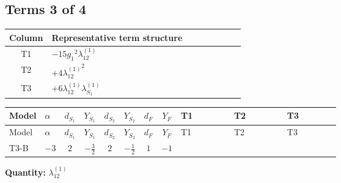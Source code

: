 \documentclass[8pt]{article}
\begin{document}
\begin{landscape}
\subsection*{Terms 3 of 4}
\begin{center}
\begin{tabular}{@{}c >{\raggedright\arraybackslash}p{0.82\linewidth}@{}}
\toprule
Column & Representative term structure \\
\midrule
T1 & \(\displaystyle -15 {g_1}^2 {\lambda_{12}^{(1)}}\) \\
\midrule
T2 & \(\displaystyle +4 {\lambda_{12}^{(1)}}^2\) \\
\midrule
T3 & \(\displaystyle +6 {\lambda_{12}^{(1)}} {\lambda_{S_1}^{(1)}}\) \\
\midrule
\bottomrule
\end{tabular}
\end{center}
\smallskip
\tiny
\begin{longtable}{@{}llcccccc >{\raggedright\arraybackslash}p{0.21\linewidth} >{\raggedright\arraybackslash}p{0.21\linewidth} >{\raggedright\arraybackslash}p{0.21\linewidth}@{}}
\toprule
Model & $\alpha$ & $d_{S_1}$ & $Y_{S_1}$ & $d_{S_2}$ & $Y_{S_2}$ & $d_F$ & $Y_F$ & T1 & T2 & T3 \\
\midrule
\endfirsthead
\toprule
Model & $\alpha$ & $d_{S_1}$ & $Y_{S_1}$ & $d_{S_2}$ & $Y_{S_2}$ & $d_F$ & $Y_F$ & T1 & T2 & T3 \\
\midrule
\endhead
T3-B & $-3$ & $2$ & $-\frac{3}{2}$ & $2$ & $-\frac{1}{2}$ & $1$ & $-1$ & \scriptsize\adjustbox{max width=\linewidth}{$\begin{gathered} -15 {g_1}^2 {\lambda_{12}^{(1)}}\end{gathered}$} & \scriptsize\adjustbox{max width=\linewidth}{$\begin{gathered} +4 {\lambda_{12}^{(1)}}^2\end{gathered}$} & \scriptsize\adjustbox{max width=\linewidth}{$\begin{gathered} +6 {\lambda_{12}^{(1)}} {\lambda_{S_1}^{(1)}}\end{gathered}$} \\
\midrule
\bottomrule
\end{longtable}
\clearpage
\noindent\textbf{Quantity: }$\lambda_{12}^{(1)}$\par\smallskip

\end{landscape}
\end{document}
